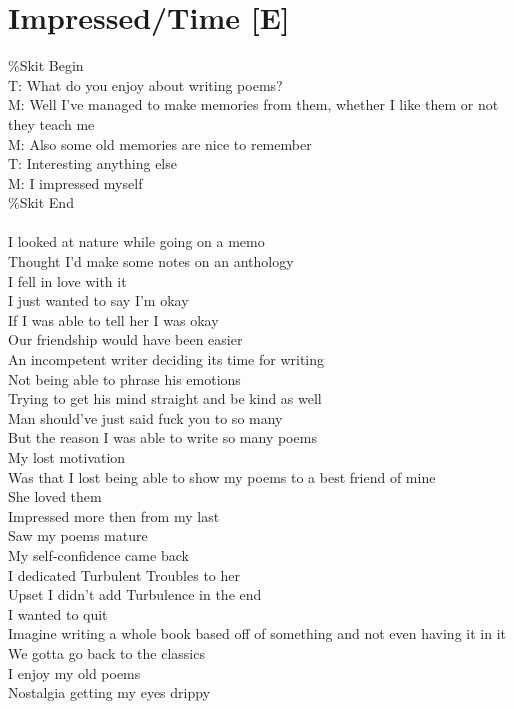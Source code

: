 \documentclass[12pt, b5paper, oneside]{book}
\begin{document}
\section{Impressed/Time [E]}
\%Skit Begin
\\T: What do you enjoy about writing poems?
\\M: Well I've managed to make memories from them, whether I like them or not they teach me
\\M: Also some old memories are nice to remember
\\T: Interesting anything else
\\M: I impressed myself
\\\%Skit End
%
\\\\I looked at nature while going on a memo
\\Thought I'd make some notes on an anthology
\\I fell in love with it
\\I just wanted to say I'm okay
\\If I was able to tell her I was okay
\\Our friendship would have been easier
\\An incompetent writer deciding its time for writing
\\Not being able to phrase his emotions
\\Trying to get his mind straight and be kind as well
\\Man should've just said fuck you to so many
\\But the reason I was able to write so many poems
\\My lost motivation
\\Was that I lost being able to show my poems to a best friend of mine
\\She loved them
\\Impressed more then from my last
\\Saw my poems mature
\\My self-confidence came back
\\I dedicated Turbulent Troubles to her
\\Upset I didn't add Turbulence in the end
\\I wanted to quit
\\Imagine writing a whole book based off of something and not even having it in it
\\We gotta go back to the classics
\\I enjoy my old poems
\\Nostalgia getting my eyes drippy
\end{document}
